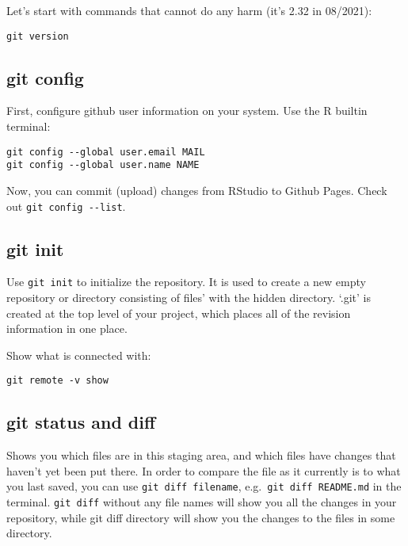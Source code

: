 \documentclass[
]{book}
\begin{document}
Let's start with commands that cannot do any harm (it's 2.32 in 08/2021):

\begin{verbatim}
git version
\end{verbatim}

\hypertarget{git-config}{%
\subsection{git config}\label{git-config}}

First, configure github user information on your system. Use the R builtin terminal:

\begin{verbatim}
git config --global user.email MAIL
git config --global user.name NAME
\end{verbatim}

Now, you can commit (upload) changes from RStudio to Github Pages. Check out \texttt{git\ config\ -\/-list}.

\hypertarget{git-init}{%
\subsection{git init}\label{git-init}}

Use \texttt{git\ init} to initialize the repository. It is used to create a new empty repository or directory consisting of files' with the hidden directory. `.git' is created at the top level of your project, which places all of the revision information in one place.

Show what is connected with:

\begin{verbatim}
git remote -v show
\end{verbatim}

\hypertarget{git-status-and-diff}{%
\subsection{git status and diff}\label{git-status-and-diff}}

Shows you which files are in this staging area, and which files have changes that haven't yet been put there. In order to compare the file as it currently is to what you last saved, you can use \texttt{git\ diff\ filename}, e.g.~\texttt{git\ diff\ README.md} in the terminal. \texttt{git\ diff} without any file names will show you all the changes in your repository, while git diff directory will show you the changes to the files in some directory.
\end{document}
